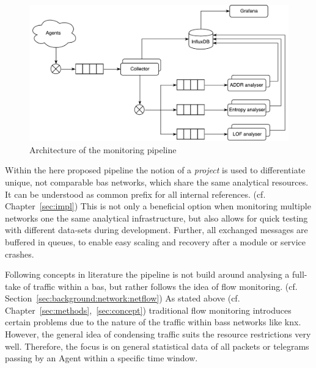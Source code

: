 \begin{figure}[h]
	\centering
	\includegraphics[width=\textwidth]{figures/300-concept-architecture.pdf}
	\caption[Pipeline Architecture]{Architecture of the monitoring pipeline  }
	\label{fig:concept:architecture}
\end{figure}

Within the here proposed pipeline the notion of a \emph{project} is used to differentiate unique, not comparable \gls{bas} networks, which share the same analytical resources. It can be understood as common prefix for all internal references. (cf. Chapter~\ref{sec:impl})
This is not only a beneficial option when monitoring multiple networks one the same analytical infrastructure, but also allows for quick testing with different data-sets during development.
Further, all exchanged messages are buffered in queues, to enable easy scaling and recovery after a module or service crashes.

Following concepts in literature \parencite[][]{Celeda2012,Pan2014} the pipeline is not build around analysing a full-take of traffic within a \gls{bas}, but rather follows the idea of flow monitoring. (cf. Section~\ref{sec:background:network:netflow})
As stated above (cf. Chapter~\ref{sec:methods},~\ref{sec:concept}) traditional flow monitoring introduces certain problems due to the nature of the traffic within \glspl{bas} networks like \gls{knx}. However, the general idea of condensing traffic suits the resource restrictions very well.
Therefore, the focus is on general statistical data of all packets or telegrams passing by an Agent within a specific time window.

